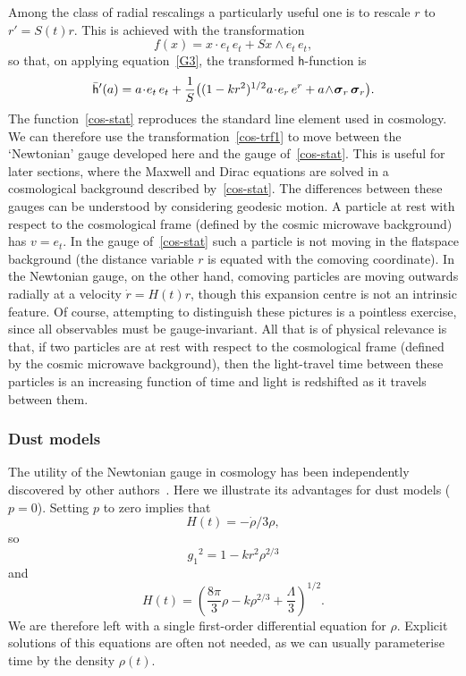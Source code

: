 \documentclass[a4paper]{article}
\numberwithin{equation}{section}
\newcommand{\dt}{\! \cdot \!}
\newcommand{\wdg}{\! \wedge \!}
\newcommand{\sig}{\mbox{\boldmath $\sigma$}}
\newcommand{\bsig}{\mbox{\boldmath $\sig$}}
\newcommand{\rdot}{\dot{r}}
\newcommand{\sigr}{\bsig_r}
\newcommand{\lih}{\mathsf{h}}
\newcommand{\lbh}{\bar{\mathsf{h}}}
\newcommand{\ho}{\lbh}
\newcommand{\rhodot}{\dot{\rho}}
\begin{document}
Among the class of radial rescalings a particularly useful one is to
rescale $r$ to $r' = S(t) r$.  This is achieved with the
transformation
%
\begin{equation}
f(x) = x \dt e_t \, e_t + S x \wdg e_t \, e_t,
\label{cos-trf1}
\end{equation}
%
so that, on applying equation~\eqref{G3}, the transformed $\lih$-function
is
%
\begin{equation}
\ho'(a) = a \dt e_t \, e_t + \frac{1}{S} \bigl( (1-kr^2)^{1/2} a \dt
e_r \, e^r + a \wdg \sigr \, \sigr \bigr).
\label{cos-stat}
\end{equation}
%
The function~\eqref{cos-stat} reproduces the standard line element used in
cosmology.  We can therefore use the transformation~\eqref{cos-trf1} to
move between the `Newtonian' gauge developed here and the gauge
of~\eqref{cos-stat}.  This is useful for later sections, where the Maxwell
and Dirac equations are solved in a cosmological background described
by~\eqref{cos-stat}.  The differences between these gauges can be
understood by considering geodesic motion.  A particle at rest with
respect to the cosmological frame (defined by the cosmic microwave
background) has $v=e_t$.  In the gauge of~\eqref{cos-stat} such a particle
is not moving in the flatspace background (the distance variable $r$
is equated with the comoving coordinate).  In the Newtonian
gauge, on the other hand, comoving particles are moving outwards
radially at a velocity $\rdot= H(t) r$, though this expansion centre
is not an intrinsic feature.  Of course, attempting to distinguish
these pictures is a pointless exercise, since all observables must be
gauge-invariant.  All that is of physical relevance is that, if two
particles are at rest with respect to the cosmological frame (defined
by the cosmic microwave background), then the light-travel time
between these particles is an increasing function of time and light is
redshifted as it travels between them.




\subsubsection*{Dust models}

The utility of the Newtonian gauge in cosmology has been independently
discovered by other authors~\cite{gaut84,ellis93}.  Here we illustrate
its advantages for dust models ($p=0$).  Setting $p$ to zero implies
that
%
\begin{equation}
H(t) = - \rhodot / 3\rho,
\end{equation}
%
so 
%
\begin{equation}
{g_1}^2 = 1-kr^2 \rho^{2/3}
\end{equation}
%
and
%
\begin{equation}
H(t) = \left( \frac{8 \pi}{3} \rho -k \rho^{2/3} + \frac{\Lambda}{3}
\right)^{1/2}.
\end{equation}
%
We are therefore left with a single first-order differential equation
for $\rho$.  Explicit solutions of this equations are often not needed,
as we can usually parameterise time by the density $\rho(t)$.
\end{document}
